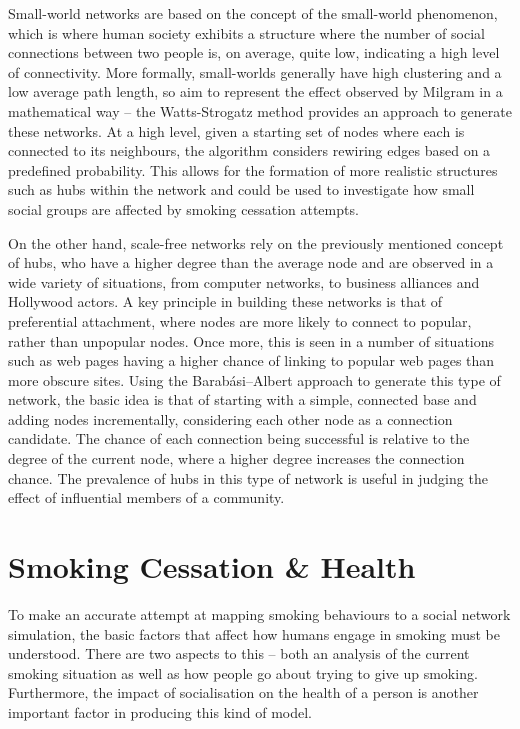 \documentclass[]{report}
\begin{document}
Small-world networks are based on the concept of the small-world phenomenon, which is where human society exhibits a structure where the number of social connections between two people is, on average, quite low, indicating a high level of connectivity\cite{milgram}. More formally, small-worlds generally have high clustering and a low average path length, so aim to represent the effect observed by Milgram in a mathematical way – the Watts-Strogatz method provides an approach to generate these networks\cite{small-world}. At a high level, given a starting set of nodes where each is connected to its neighbours, the algorithm considers rewiring edges based on a predefined probability. This allows for the formation of more realistic structures such as hubs within the network and could be used to investigate how small social groups are affected by smoking cessation attempts.

On the other hand, scale-free networks rely on the previously mentioned concept of hubs, who have a higher degree than the average node and are observed in a wide variety of situations, from computer networks, to business alliances and Hollywood actors. A key principle in building these networks is that of preferential attachment, where nodes are more likely to connect to popular, rather than unpopular nodes. Once more, this is seen in a number of situations such as web pages having a higher chance of linking to popular web pages than more obscure sites\cite{BA-SciAm}. Using the Barabási–Albert approach to generate this type of network, the basic idea is that of starting with a simple, connected base and adding nodes incrementally, considering each other node as a connection candidate\cite{BAStat}. The chance of each connection being successful is relative to the degree of the current node, where a higher degree increases the connection chance. The prevalence of hubs in this type of network is useful in judging the effect of influential members of a community.


\section{Smoking Cessation \& Health}

To make an accurate attempt at mapping smoking behaviours to a social network simulation, the basic factors that affect how humans engage in smoking must be understood. There are two aspects to this – both an analysis of the current smoking situation as well as how people go about trying to give up smoking. Furthermore, the impact of socialisation on the health of a person is another important factor in producing this kind of model.
\end{document}
